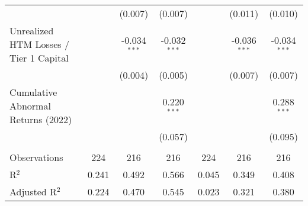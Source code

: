 \begin{table}[htbp]
\begin{adjustbox}{width = 1.2\textwidth, center}
\begin{tabular}{lcccccc}
                                                &                & (0.007)        & (0.007)        &                & (0.011)        & (0.010)\\   
         Unrealized HTM Losses / Tier 1 Capital &                & -0.034$^{***}$ & -0.032$^{***}$ &                & -0.036$^{***}$ & -0.034$^{***}$\\   
                                                &                & (0.004)        & (0.005)        &                & (0.007)        & (0.007)\\   
         Cumulative Abnormal Returns (2022)     &                &                & 0.220$^{***}$  &                &                & 0.288$^{***}$\\   
                                                &                &                & (0.057)        &                &                & (0.095)\\   
          \\
         Observations                           & 224            & 216            & 216            & 224            & 216            & 216\\  
         R$^2$                                  & 0.241          & 0.492          & 0.566          & 0.045          & 0.349          & 0.408\\  
         Adjusted R$^2$                         & 0.224          & 0.470          & 0.545          & 0.023          & 0.321          & 0.380\\  
         \bottomrule
      \end{tabular}
   \end{adjustbox}
\end{table}


